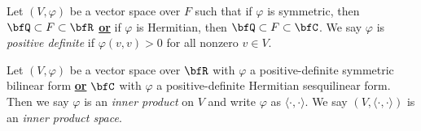     \begin{definition}
        Let $(V,\varphi)$ be a vector space over $F$ such that if $\varphi$ is symmetric, then $\bfQ \subset F \subset \bfR$ \underline{\textbf{or}} if $\varphi$ is Hermitian, then $\bfQ \subset F \subset \bfC$. We say $\varphi$ is \textit{positive definite} if $\varphi(v,v) > 0$ for all nonzero $v \in V$.
    \end{definition}

    \begin{definition}
        Let $(V,\varphi)$ be a vector space over $\bfR$ with $\varphi$ a positive-definite symmetric bilinear form \underline{\textbf{or}} $\bfC$ with $\varphi$ a positive-definite Hermitian sesquilinear form. Then we say $\varphi$ is an \textit{inner product} on $V$ and write $\varphi$ as $\langle \cdot,\cdot \rangle$. We say $(V,\langle \cdot,\cdot \rangle)$ is an \textit{inner product space}.
    \end{definition}

